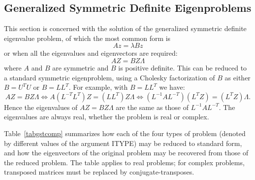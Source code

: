 
\subsection{Generalized Symmetric Definite Eigenproblems}\label{gsdeproblems}

This section is concerned with the solution of the generalized symmetric definite eigenvalue
problem, of which the most common form is
\[
 Az=\lambda Bz
\]
or when all the eigenvalues and eigenvectors are required:
\[
A Z = B Z \Lambda
\]
where $A$ and $B$ are symmetric and $B$ is positive definite.
This can be reduced to a standard symmetric eigenproblem,
using a Cholesky factorization of $B$ as either $B = U^T U$ or $B = L L^T$.
For example, with $B = L L^T$ we have:
\[
A Z = B Z \Lambda \Leftrightarrow A (L^{-T} L^T) Z = (L L^T ) Z \Lambda \Leftrightarrow
( L^{-1} A L^{-T} )  (L^T Z) = (L^T Z) \Lambda.
\]
Hence the eigenvalues of $AZ = BZ\Lambda$ are the same as those of $L^{-1} A L^{-T}$.
The eigenvalues are always real, whether the problem is real or complex.

Table~\ref{tabgstcomp} summarizes how each of the four types of problem
(denoted by different values of the argument ITYPE) may be reduced to
standard form, and how the eigenvectors of the original problem may be recovered
from those of the reduced problem. The table applies to real problems; for complex problems,
transposed matrices must be replaced by conjugate-transposes.

